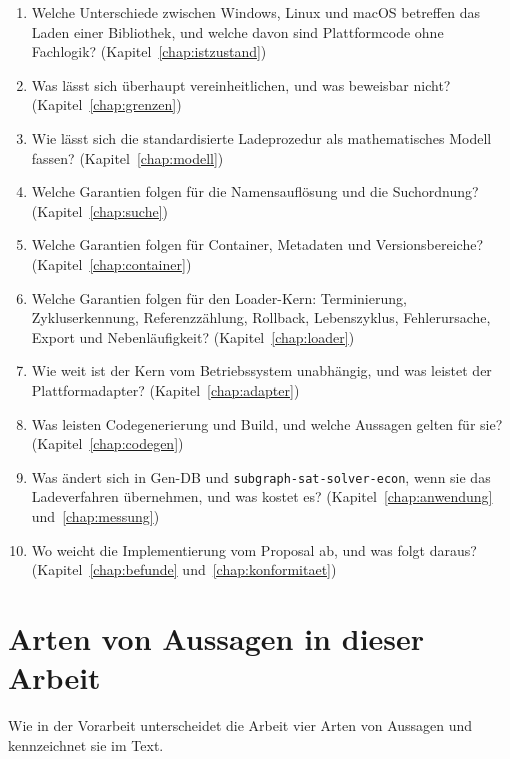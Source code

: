 \documentclass[a4paper,12pt,twoside]{report}
\DeclareRobustCommand{\_}{\ifmmode\mbox{\textunderscore}\else\textunderscore\allowbreak{}\fi}
\theoremstyle{definition}
\begin{document}
\begin{enumerate}
	\item Welche Unterschiede zwischen Windows, Linux und macOS betreffen das Laden einer Bibliothek, und welche davon sind Plattformcode ohne Fachlogik? (Kapitel~\ref{chap:istzustand})
	\item Was lässt sich überhaupt vereinheitlichen, und was beweisbar nicht? (Kapitel~\ref{chap:grenzen})
	\item Wie lässt sich die standardisierte Ladeprozedur als mathematisches Modell fassen? (Kapitel~\ref{chap:modell})
	\item Welche Garantien folgen für die Namensauflösung und die Suchordnung? (Kapitel~\ref{chap:suche})
	\item Welche Garantien folgen für Container, Metadaten und Versionsbereiche? (Kapitel~\ref{chap:container})
	\item Welche Garantien folgen für den Loader-Kern: Terminierung, Zykluserkennung, Referenzzählung, Rollback, Lebenszyklus, Fehlerursache, Export und Nebenläufigkeit? (Kapitel~\ref{chap:loader})
	\item Wie weit ist der Kern vom Betriebssystem unabhängig, und was leistet der Plattformadapter? (Kapitel~\ref{chap:adapter})
	\item Was leisten Codegenerierung und Build, und welche Aussagen gelten für sie? (Kapitel~\ref{chap:codegen})
	\item Was ändert sich in Gen-DB und \texttt{subgraph-sat-solver-econ}, wenn sie das Ladeverfahren übernehmen, und was kostet es? (Kapitel~\ref{chap:anwendung} und~\ref{chap:messung})
	\item Wo weicht die Implementierung vom Proposal ab, und was folgt daraus? (Kapitel~\ref{chap:befunde} und~\ref{chap:konformitaet})
\end{enumerate}

\section{Arten von Aussagen in dieser Arbeit}
\label{sec:aussagenarten}

Wie in der Vorarbeit unterscheidet die Arbeit vier Arten von Aussagen und kennzeichnet sie im Text.
\end{document}
